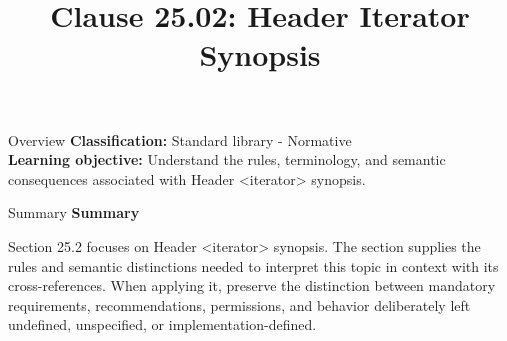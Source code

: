 \documentclass[10pt,letterpaper]{article}
\title{Clause 25.02: Header Iterator Synopsis}
\author{}
\date{}
\begin{document}
\maketitle
\begin{CornellOverviewBox}{Overview}
\textbf{Classification:} Standard library - Normative\\[2pt]
\textbf{Learning objective:} Understand the rules, terminology, and semantic consequences associated with Header <iterator> synopsis.
\end{CornellOverviewBox}\begin{CornellSummaryBox}{Summary}
{\sffamily\bfseries\color{Accent} Summary}\par\vspace{3pt}Section 25.2 focuses on Header <iterator> synopsis. The section supplies the rules and semantic distinctions needed to interpret this topic in context with its cross-references. When applying it, preserve the distinction between mandatory requirements, recommendations, permissions, and behavior deliberately left undefined, unspecified, or implementation-defined.
\end{CornellSummaryBox}
\end{document}
